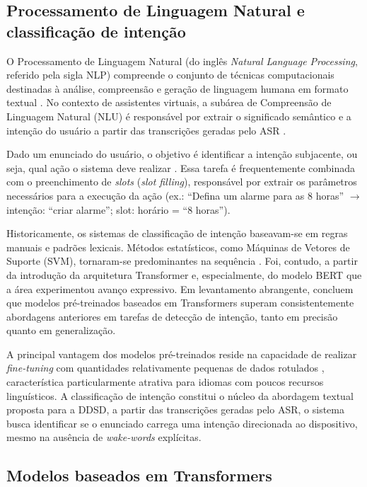 \documentclass[
    12pt,                %
    openright,           %
    oneside,             %
    a4paper,             %
    english,             %
    brazil               %
]{abntex2}
\begin{document}
\subsection{Processamento de Linguagem Natural e classificação de intenção}

O Processamento de Linguagem Natural (do inglês \textit{Natural Language Processing}, referido pela sigla NLP) compreende o conjunto de técnicas computacionais destinadas à análise, compreensão e geração de linguagem humana em formato textual \cite{Jurafsky2024}. No contexto de assistentes virtuais, a subárea de Compreensão de Linguagem Natural (NLU) é responsável por extrair o significado semântico e a intenção do usuário a partir das transcrições geradas pelo ASR \cite{Weld2022}.

Dado um enunciado do usuário, o objetivo é identificar a intenção subjacente, ou seja, qual ação o sistema deve realizar \cite{Weld2022}. Essa tarefa é frequentemente combinada com o preenchimento de \textit{slots} (\textit{slot filling}), responsável por extrair os parâmetros necessários para a execução da ação (ex.: ``Defina um alarme para as 8 horas'' $\rightarrow$ intenção: ``criar alarme''; slot: horário = ``8 horas'').

Historicamente, os sistemas de classificação de intenção baseavam-se em regras manuais e padrões lexicais. Métodos estatísticos, como Máquinas de Vetores de Suporte (SVM), tornaram-se predominantes na sequência \cite{Manning2008}. Foi, contudo, a partir da introdução da arquitetura Transformer \cite{Vaswani2017} e, especialmente, do modelo BERT \cite{Devlin2019} que a área experimentou avanço expressivo. Em levantamento abrangente,  concluem que modelos pré-treinados baseados em Transformers superam consistentemente abordagens anteriores em tarefas de detecção de intenção, tanto em precisão quanto em generalização.

A principal vantagem dos modelos pré-treinados reside na capacidade de realizar \textit{fine-tuning} com quantidades relativamente pequenas de dados rotulados \cite{Devlin2019}, característica particularmente atrativa para idiomas com poucos recursos linguísticos. A classificação de intenção constitui o núcleo da abordagem textual proposta para a DDSD, a partir das transcrições geradas pelo ASR, o sistema busca identificar se o enunciado carrega uma intenção direcionada ao dispositivo, mesmo na ausência de \textit{wake-words} explícitas.

\subsection{Modelos baseados em Transformers}
\end{document}
